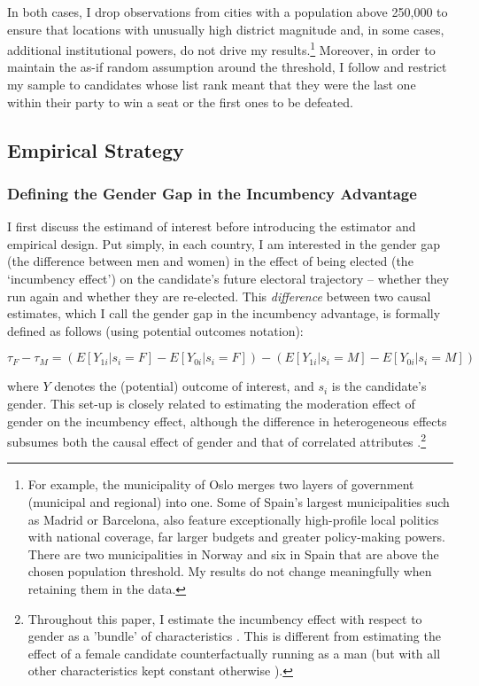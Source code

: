 \documentclass[12pt]{article}
\begin{document}
In both cases, I drop observations from cities with a population above 250,000 to ensure that locations with unusually high district magnitude and, in some cases, additional institutional powers, do not drive my results.\footnote{For example, the municipality of Oslo merges two layers of government (municipal and regional) into one. Some of Spain's largest municipalities such as Madrid or Barcelona, also feature exceptionally high-profile local politics with national coverage, far larger budgets and greater policy-making powers. There are two municipalities in Norway and six in Spain that are above the chosen population threshold. My results do not change meaningfully when retaining them in the data.} Moreover, in order to maintain the as-if random assumption around the threshold, I follow \citet{fiva2018a} and restrict my sample to candidates whose list rank meant that they were the last one within their party to win a seat or the first ones to be defeated.

\subsection{Empirical Strategy}

\subsubsection{Defining the Gender Gap in the Incumbency Advantage}

I first discuss the estimand of interest before introducing the estimator and empirical design. Put simply, in each country, I am interested in the gender gap (the difference between men and women) in the effect of being elected (the `incumbency effect') on the candidate's future electoral trajectory -- whether they run again and whether they are re-elected. This \emph{difference} between two causal estimates, which I call the gender gap in the incumbency advantage, is formally defined as follows (using potential outcomes notation):

\begin{equation}
\tau_F - \tau_M = (E[Y_{1i} | s_i = F] - E[Y_{0i} | s_i = F]) - (E[Y_{1i} | s_i = M] - E[Y_{0i} | s_i = M])
\end{equation}

where $Y$ denotes the (potential) outcome of interest, and $s_i$ is the candidate's gender.
This set-up is closely related to estimating the moderation effect of gender on the incumbency effect, although the difference in heterogeneous effects subsumes both the causal effect of gender and that of correlated attributes \citep{bansak2021}.\footnote{
    Throughout this paper, I estimate the incumbency effect with respect to gender as a 'bundle' of characteristics \citep[cf.][]{sen2016}. This is different from estimating the effect of a female candidate counterfactually running as a man (but with all other characteristics kept constant otherwise \citep{marshall2021}).
}
\end{document}
